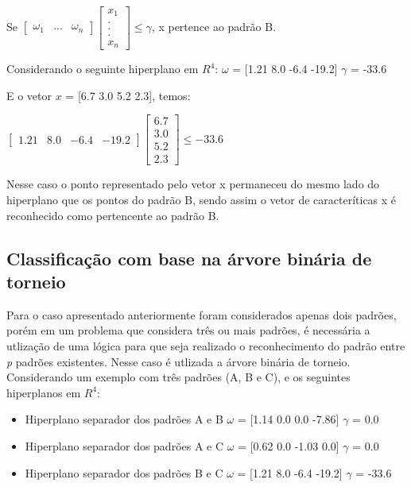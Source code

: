 Se $ \begin{bmatrix}
\omega _{1} & ... & \omega _{n} 
\end{bmatrix}
\begin{bmatrix}
x_{1}
\\ 
.
\\
. 
\\
. 
\\
x_{n}
\end{bmatrix}
\leq  \gamma $, x pertence ao padrão B.

Considerando o seguinte hiperplano em $R^{4}$:
$\omega$ = [1.21  8.0  -6.4  -19.2]
$\gamma$ = -33.6

E o vetor $x$ = [6.7  3.0  5.2  2.3], temos:

$ \begin{bmatrix}
1.21 & 8.0 & -6.4 & -19.2 
\end{bmatrix}
\begin{bmatrix}
6.7
\\ 
3.0
\\
5.2 
\\
2.3 
\end{bmatrix}
\leq  -33.6 $ 

Nesse caso o ponto representado pelo vetor x permaneceu do mesmo lado do hiperplano que os pontos do padrão B, sendo assim o vetor de caracteríticas x é reconhecido como pertencente ao padrão B. 

\subsection{Classificação com base na árvore binária de torneio}
Para o caso apresentado anteriormente foram considerados apenas dois padrões, porém em um problema que considera três ou mais padrões, é necessária a utlização de uma lógica para que seja realizado o reconhecimento do padrão entre \textit{p} padrões existentes. Nesse caso é utlizada a árvore binária de torneio.
Considerando um exemplo com três padrões (A, B e C), e os seguintes hiperplanos em $R^{4}$:
\begin{itemize}
\item Hiperplano separador dos padrões A e B
\subitem $\omega$ = [1.14  0.0  0.0  -7.86]
\subitem $\gamma$ = 0.0
\item Hiperplano separador dos padrões A e C
\subitem $\omega$ = [0.62  0.0  -1.03  0.0]
\subitem $\gamma$ = 0.0
\item Hiperplano separador dos padrões B e C
\subitem $\omega$ = [1.21  8.0  -6.4  -19.2]
\subitem $\gamma$ = -33.6
\end{itemize}

